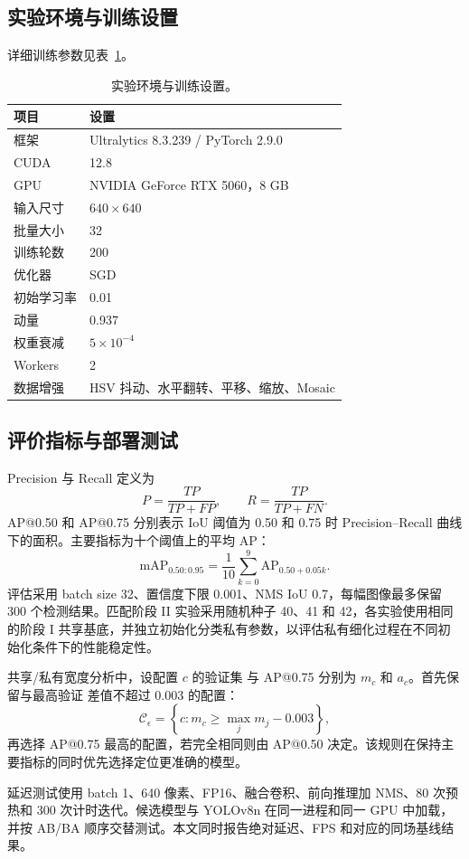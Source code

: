 \subsection{实验环境与训练设置}
详细训练参数见表~\ref{tab:environment}。

\begin{table}[!t]
\caption{实验环境与训练设置。\label{tab:environment}}
\centering\srpatablesetup
\begin{tabular}{@{}p{}p{}@{}}
\toprule
项目 & 设置\\
\midrule
框架 & Ultralytics 8.3.239 / PyTorch 2.9.0\\
CUDA & 12.8\\
GPU & NVIDIA GeForce RTX 5060，8 GB\\
输入尺寸 & $640\times640$\\
批量大小 & 32\\
训练轮数 & 200\\
优化器 & SGD\\
初始学习率 & 0.01\\
动量 & 0.937\\
权重衰减 & $5\times10^{-4}$\\
Workers & 2\\
数据增强 & HSV 抖动、水平翻转、平移、缩放、Mosaic\\
\bottomrule
\end{tabular}
\end{table}

\subsection{评价指标与部署测试}
Precision 与 Recall 定义为
\begin{equation}
P=\frac{TP}{TP+FP},\qquad R=\frac{TP}{TP+FN}.
\label{eq:pr}
\end{equation}
AP@0.50 和 AP@0.75 分别表示 IoU 阈值为 0.50 和 0.75 时 Precision--Recall 曲线下的面积。主要指标为十个阈值上的平均 AP：
\begin{equation}
\mathrm{mAP}_{0.50:0.95}=\frac{1}{10}\sum_{k=0}^{9}\mathrm{AP}_{0.50+0.05k}.
\label{eq:map}
\end{equation}
评估采用 batch size 32、置信度下限 0.001、NMS IoU 0.7，每幅图像最多保留 300 个检测结果。匹配阶段 II 实验采用随机种子 40、41 和 42，各实验使用相同的阶段 I 共享基底，并独立初始化分类私有参数，以评估私有细化过程在不同初始化条件下的性能稳定性。

共享/私有宽度分析中，设配置 $c$ 的验证集 \mapall{} 与 AP@0.75 分别为 $m_c$ 和 $a_c$。首先保留与最高验证 \mapall{} 差值不超过 0.003 的配置：
\begin{equation}
\mathcal{C}_{\epsilon}=\left\{c:m_c\ge \max_j m_j-0.003\right\},
\label{eq:selection}
\end{equation}
再选择 AP@0.75 最高的配置，若完全相同则由 AP@0.50 决定。该规则在保持主要指标的同时优先选择定位更准确的模型。

延迟测试使用 batch 1、640 像素、FP16、融合卷积、前向推理加 NMS、80 次预热和 300 次计时迭代。候选模型与 YOLOv8n 在同一进程和同一 GPU 中加载，并按 AB/BA 顺序交替测试。本文同时报告绝对延迟、FPS 和对应的同场基线结果。

